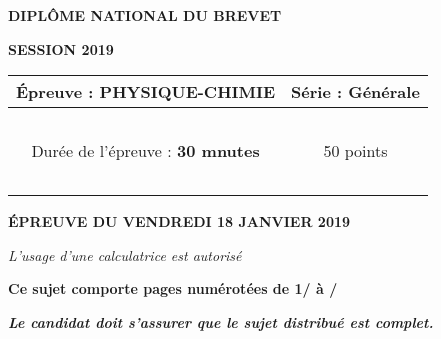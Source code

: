 \begin{center}
	
	{\scshape\LARGE \textbf{DIPLÔME NATIONAL DU BREVET} \par}
	\vspace{1cm}
	{\scshape\Large \textbf{SESSION 2019}\par}
	\vspace{1.5cm}
	

	\begin{large}
		\begin{tabular}{|@{\ }c@{\ }|@{\ }c@{\ }|}
		\hline
		\'Epreuve : \textbf{PHYSIQUE-CHIMIE} & Série : \textbf{Générale} \\ \hline
		\ & \ \\
		Durée de l'épreuve : \textbf{30 mnutes} & 50 points \\ 
		\ & \ \\
		\hline
	\end{tabular}
	\end{large}
		
	\vspace{1cm}
	{\large\bfseries \'EPREUVE DU VENDREDI 18 JANVIER 2019}
	
	\vspace{1cm}
	{\itshape L'usage d'une calculatrice est autorisé\par}
	\vspace{1.5cm}
	{\bfseries Ce sujet comporte \pageref{LastPage} pages numérotées de 1/\pageref{LastPage} à \pageref{LastPage}/\pageref{LastPage} }
	
	
	\vspace{0.5cm}
	{\bfseries\itshape Le candidat doit s'assurer que le sujet distribué est complet. }
	
	
%			
	

\end{center}
\newpage